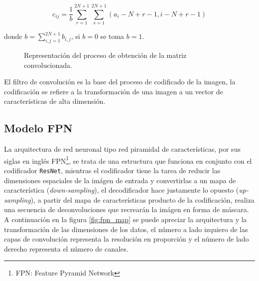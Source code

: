 \begin{equation}
c_{ij} = \frac{1}{b} \sum_{r=1}^{2N+1}\sum_{s=1}^{2N+1}(a_i-N+r-1, i-N+r-1)
\label{eq:conv_1}
\end{equation}

donde $b = \sum_{i,j=1}^{2N+1} b_{i,j}$, si $b=0$ se toma $b=1$.

\begin{figure}[H]
    \centering
    \caption{Representación del proceso de obtención de la matriz convolucionada.}
\end{figure}

El filtro de convolución es la base del proceso de codificado de la imagen, la codificación se refiere a la transformación de una imagen a un vector de características de alta dimensión. 

\subsection{Modelo FPN}
La arquitectura de red neuronal tipo red piramidal de características, por sus siglas en inglés FPN\footnote{FPN: Feature Pyramid Network}, se trata de una estructura que funciona en conjunto con el codificador \texttt{ResNet}, mientras el codificador tiene la tarea de reducir las dimensiones espaciales de la imágen de entrada y convertirlas a un mapa de característica (\emph{down-sampling}), el decodificador hace justamente lo opuesto (\emph{up-sampling}), a partir del mapa de características producto de la codificación, realiza una secuencia de deconvoluciones que recrearán la imágen en forma de máscara.
A continuación en la figura \ref{fig:fpn_map} se puede apreciar la arquitectura y la transformación de las dimensiones de los datos, el número a lado izquiero de las capas de convolución representa la resolución en proporción y el número de lado derecho representa el número de canales.


